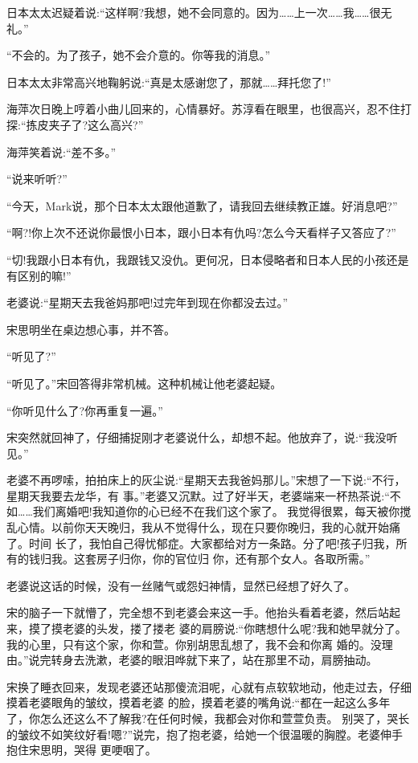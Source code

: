 \documentclass[11pt,a4paper,onecolumn]{article}
\begin{document}
日本太太迟疑着说:``这样啊?我想，她不会同意的。因为……上一次……我……很无礼。''

``不会的。为了孩子，她不会介意的。你等我的消息。''

日本太太非常高兴地鞠躬说:``真是太感谢您了，那就……拜托您了!''

海萍次日晚上哼着小曲儿回来的，心情暴好。苏淳看在眼里，也很高兴，忍不住打探:``拣皮夹子了?这么高兴?''

海萍笑着说:``差不多。''

``说来听听?''

``今天，Mark说，那个日本太太跟他道歉了，请我回去继续教正雄。好消息吧?''

``啊?!你上次不还说你最恨小日本，跟小日本有仇吗?怎么今天看样子又答应了?''

``切!我跟小日本有仇，我跟钱又没仇。更何况，日本侵略者和日本人民的小孩还是有区别的嘛!''

老婆说:``星期天去我爸妈那吧!过完年到现在你都没去过。''

宋思明坐在桌边想心事，并不答。

``听见了?''

``听见了。''宋回答得非常机械。这种机械让他老婆起疑。

``你听见什么了?你再重复一遍。''

宋突然就回神了，仔细捕捉刚才老婆说什么，却想不起。他放弃了，说:``我没听见。''

老婆不再啰嗦，拍拍床上的灰尘说:``星期天去我爸妈那儿。''宋想了一下说:``不行，星期天我要去龙华，有
事。''老婆又沉默。过了好半天，老婆端来一杯热茶说:``不如……我们离婚吧!我知道你的心已经不在我们这个家了。
我觉得很累，每天被你搅乱心情。以前你天天晚归，我从不觉得什么，现在只要你晚归，我的心就开始痛了。时间
长了，我怕自己得忧郁症。大家都给对方一条路。分了吧!孩子归我，所有的钱归我。这套房子归你，你的官位归
你，还有那个女人。各取所需。''

老婆说这话的时候，没有一丝赌气或怨妇神情，显然已经想了好久了。

宋的脑子一下就懵了，完全想不到老婆会来这一手。他抬头看着老婆，然后站起来，摸了摸老婆的头发，搂了搂老
婆的肩膀说:``你瞎想什么呢?我和她早就分了。我的心里，只有这个家，你和萱。你别胡思乱想了，我不会和你离
婚的。没理由。''说完转身去洗漱，老婆的眼泪哗就下来了，站在那里不动，肩膀抽动。

宋换了睡衣回来，发现老婆还站那傻流泪呢，心就有点软软地动，他走过去，仔细摸着老婆眼角的皱纹，摸着老婆
的脸，摸着老婆的嘴角说:``都在一起这么多年了，你怎么还这么不了解我?在任何时候，我都会对你和萱萱负责。
别哭了，哭长的皱纹不如笑纹好看!嗯?''说完，抱了抱老婆，给她一个很温暖的胸膛。老婆伸手抱住宋思明，哭得
更哽咽了。
\end{document}
